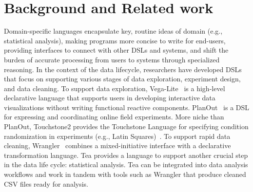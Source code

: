\section{Background and Related work} \label{sec:relatedWorkTea}
Domain-specific languages encapsulate key, routine ideas of domain (e.g.,
statistical analysis), making programs more concise to write for end-users,
providing interfaces to connect with other DSLs and systems, and shift the
burden of accurate processing from users to systems through specialized
reasoning. In the context of the data lifecycle, researchers have developed DSLs
that focus on supporting various stages of data exploration, experiment design,
and data cleaning. To support data exploration,
Vega-Lite~\cite{satyanarayan2017vega} is a high-level declarative language that
supports users in developing interactive data visualizations without writing
functional reactive components. PlanOut~\cite{bakshy2014planout} is a DSL for
expressing and coordinating online field experiments. More niche than PlanOut,
Touchstone2 provides the Touchstone Language for specifying condition
randomization in experiments (e.g., Latin
Squares)~\cite{eiselmayer2019touchstone2}.%
To support rapid data cleaning,  Wrangler~\cite{kandel2011wrangler} combines a
mixed-initiative interface with a declarative transformation language. Tea
provides a language to support another crucial step in the data life cycle:
statistical analysis. Tea can be integrated into data analysis workflows and
work in tandem with tools such as Wrangler that produce cleaned CSV files ready
for analysis.


